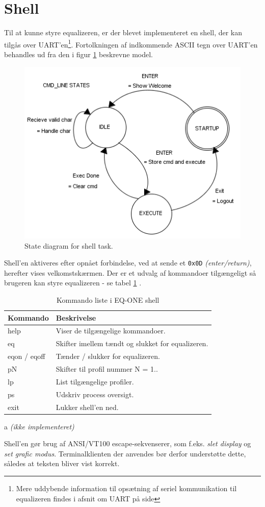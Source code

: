 \section{Shell}
Til at kunne styre equalizeren, er der blevet implementeret en shell, der kan tilgås over UART'en\footnote{Mere uddybende information til opsætning af seriel kommunikation til equalizeren findes i afsnit om UART på side \pageref{subsec:uart}}.
Fortolkningen af indkommende ASCII tegn over UART'en behandles ud fra den i figur \ref{fig:shell_task} beskrevne model.

\begin{figure}[h!]
	\centering
	\includegraphics[width=.6\textwidth]{billeder/cmd_states.png}
	\caption{State diagram for shell task.}
	\label{fig:shell_task}
\end{figure}

Shell'en aktiveres efter opnået forbindelse, ved at sende et \texttt{0x0D} \textit{(enter/return)}, herefter vises velkomstskærmen.
Der er et udvalg af kommandoer tilgængeligt så brugeren kan styre equalizeren - se tabel \ref{tab:shell_cmd} .

\begin{table}[h!]
	\caption{Kommando liste i EQ-ONE shell}
	\label{tab:shell_cmd}
	\begin{threeparttable}
		\begin{tabular}{l p{}}
			\toprule
			\textbf{Kommando}      & \textbf{Beskrivelse}   \\ 
			\midrule
			help		& Viser de tilgængelige kommandoer. \\
			eq       	& Skifter imellem tændt og slukket for equalizeren. \\
			eqon / eqoff & Tænder / slukker for equalizeren. \tnote{a}\\
			pN			& Skifter til profil nummer N = 1.. \\
			lp			& List tilgængelige profiler.\tnote{a}\\
			ps		    & Udskriv process oversigt. \\
			exit 		& Lukker shell'en ned. \\
			\bottomrule
		\end{tabular}
		
		\begin{tablenotes}
			\item[a] \textit{(ikke implementeret)}
		\end{tablenotes}
	\end{threeparttable}
\end{table}

Shell'en gør brug af ANSI/VT100 escape-sekvenserer, som f.eks. \textit{slet display} og \textit{set grafic modus}.
Terminalklienten der anvendes bør derfor understøtte dette, således at teksten bliver vist korrekt.







